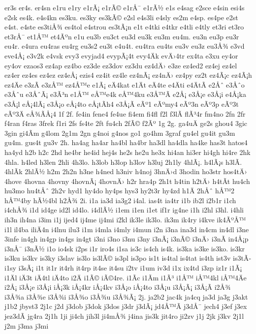{er3s
er4s.
er4sn
e1ru
e1ry
e1rÃ¡
e1rÃ©
e1rÅ¯
e1rÃ½
e1s
e4sag
e2sce
e4sin
esi4s
e2sk
es4k.
e4s4kn
es3ku.
es3ky
es3kÃ©
e2sl
e4s3li
e4sly
es2m
e4sp.
es4pe
e2st
e4st.
e4ste
es3tiÅ¾
es4tol
e4strou
es3tÃ¡n
e1t
e4tki
e4tkr
e4tli
e4tly
et3ri
et3ro
et3rÅ¯
et1Å™
et4Ãºn
e1u
eu3b
eu3ct
eu3d
eu3k
eu3m
eu4m.
eu3n
eu3p
eu3r
eu4r.
e4ura
eu4ras
eu4rg
eu3s2
eu3t
e4u4t.
eu4tra
eu4ts
eu3v
eu3z
eu3Å¾
e3vd
eve4Å¡
e3v2k
e4vsk
evy3
evyjad4
evypÃ¡4t
evy4Äk
evÄ›4tr
ex4ta
e3xu
ey4or
ey4ov
ezaos3
ez4ap
ez4bo
ez3de
ez3dov
ez3du
ez4dÄ›
e3ze
ez4ed2
ez4ej
ez4el
ez4er
ez4es
ez4ez
ez4eÅ¡
ezis4
ez4it
ez4le
ez4nÃ¡
ez4nÄ›
ez4py
ez2t
ez4Ã¡c
ez4Ã¡h
ez4Äe
e3zÃ­
e3zÅ™
ez4Å™e
e1Ã¡
eÄ4kat
e1Ät
eÄ4te
e4Äti
e4ÄtÃ­
e2Åˆ
e3Åˆo
e3Åˆu
e3ÅˆÃ¡
e3Ã³n
e1Å™
eÅ™e4k
eÅ™4ku
e3Å™Ã­
e2Å¡
e3Å¡e
e3Å¡i
e4Å¡ka
e3Å¡l
eÅ¡4lÃ¡
e3Å¡o
eÅ¡4to
eÅ¡tÃ­h4
e3Å¡Ã­
eÃº1
eÃºmy4
eÃº3n
eÃº3p
eÃº3t
eÃº3Ä
eÅ¾Ã­Å¡4
1f
2f.
fe4in
fene4
fe4ue
fi4em
fi4fl
f2l
f3lÃ­
flÃ³4r
fm4no
2fn
2fr
f4ran
f4ras
3frek
f1ri
2fs
fs4te
2ft
fu4ch
2fÃ©
f2Ãº
1g
2g.
ga4uÄ
ge2s
ghou4
3gic
3gin
gi4Ã­m
g4lom
2g1m
2gn
g4noi
g4nos
go1
go4hm
3graf
gu4el
gu4it
gu3m
gu4m.
gus4t
gu3v
2h.
ha4ag
ha4ar
ha4bl
ha4br
ha3dl
ha4dla
ha4ke
has3t
hatos4
ha4yd
h2b
h2c
2hd
he4br
he4id
hej4s
he2s
he2u
he3x
hi4an
hi3er
hi4gh
hi4re
2hk
4hla.
h4led
h3len
2hli
4h3lo.
h3lob
h3lop
h3lov
h3luj
2h1ly
4hlÃ¡.
h4lÃ¡s
h3lÃ­.
4hlÃ­k
2hlÃ½
h2m
2h2n
h3ne
h4ned
h3niv
h4noj
3hnÄ›d
3hodin
ho3str
hos4tÄ›
4hove
4hovna
4hovny
4hovnÃ¡
4hovnÄ›
h2r
hra4p
2h1t
h4tin
h2tÄ›
h4tÃ­t
hu4ch
hu3mo
hu4tÅˆ
2h2v
hyd1
hy4do
hy4ps
hys3
hy2t3r
hy4zd
h1Ä
2hÅˆ
hÅ™2
hÅ™4by
hÃ½4bl
h2Å¾
2i.
i1a
ia3d
ia3g2
i4al.
ias4t
ia4tr
i1b
ib2l
i2b1r
i1ch
i4chÅ¾
i1d
id4ge
id2l
id4lo.
i4dlÃ½
i1em
i1en
i1et
if1r
ig4ne
i1h
i2hl
i3hl.
i4hli
ih3n
ih4na
i3im
i1j
ijed4
ij4me
ij4mi
i2kl
ik3le
ik3lo.
ik3m
ik4ry
i4kve
ik4ÃºÅ™
i1l
il4ba
iliÄ4n
i4lnu
ilu3
i1m
i4mla
i4mly
i4mun
i2n
i3na
ina3d
in4cm
in4dl
i3ne
3infe
in4gh
in4gp
in4gs
in4gt
i3ni
i3no
i3nu
i3ny
i3nÃ¡
i3nÃ©
i3nÄ›
i3nÃ­
in4Å¡p
i3nÅ¯
i3nÃ½
i1o
io4sk
i2ps
i1r
iro4s
i1sa
is3c
is4ch
is4k.
is3ka
is3ke
is3ko.
is3kr
is3ku
is3kv
is3ky
i3slav
is3lo
is3lÃ©
is3pl
is3po
is1t
is4tal
is4tat
is4th
ist3v
is3tÃ­
i1sy
i3sÃ¡
i1t
it1r
it4rh
it4rp
it4se
it4su
i2tv
i1um
iv3d
i1x
ix4td
i3zp
iz1r
i1Ã¡
i1Äl
iÄ3t
iÄ4tl
iÄ4to
i2Ä
i1Ã©
iÃ©4re.
i1Ã­c
i1Ã­m
i1Ã³
i1Å™
iÅ™4kl
iÅ™4Äe
i2Å¡
i3Å¡e
i3Å¡i
iÅ¡3k
iÅ¡4kr
iÅ¡4kv
i3Å¡o
iÅ¡4to
i3Å¡u
i3Å¡Ã¡
i3Å¡Ã­
i2Å¾
i3Å¾a
i3Å¾e
i3Å¾i
i3Å¾o
i3Å¾u
i3Å¾Ã¡
2j.
ja2b2
jac4k
ja4cq
ja3d
ja3g
j3akt
j1b2
jbyst3
2j1c
j2d
j3dob
j3dok
j3dos
j3dr
j3dÃ¡
jd4Å™Ã­
j3dÅ¯
jech4
j3ef
j3ex
jez3dÃ­
jg4ra
2j1h
1ji
ji4ch
jih3l
ji4mÅ¾
j4ina
jis3k
jit4ro
ji2zv
j1j
2jk
j3kv
2j1l
j2m
j3ma
j3mi
}
